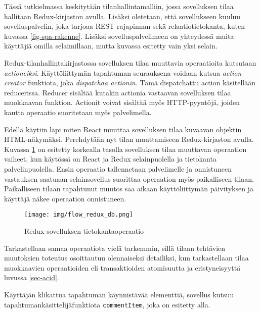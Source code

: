 \documentclass[finnish,twoside,censored,csm,sw-track-2018]{HYthesisML}
\begin{document}

Tässä tutkielmassa keskitytään tilanhallintamalliin, jossa sovelluksen tilaa hallitaan Redux-kirjaston \citep{redux} avulla. Lisäksi oletetaan, että sovellukseen kuuluu sovelluspalvelin, joka tarjoaa REST-rajapinnan sekä relaatiotietokanta, kuten kuvassa \ref{fig-spa-rakenne}. Lisäksi sovelluspalvelimeen on yhteydessä muita käyttäjiä omilla selaimillaan, mutta kuvassa esitetty vain yksi selain.

Redux-tilanhallintakirjastossa sovelluksen tilaa muuttavia operaatioita kutsutaan \textit{actioneiksi}. Käyttöliittymän tapahtuman seurauksena voidaan kutsua \textit{action creator} funktiota, joka \textit{dispatchaa actionin}. Tämä dispatchattu action käsitellään reducerissa. Reducer sisältää kutakin actionia vastaavan sovelluksen tilaa muokkaavan funktion. Actionit voivat sisältää myös HTTP-pyyntöjä, joiden kautta operaatio suoritetaan myös palvelimella.

Edellä käytiin läpi miten React muuttaa sovelluksen tilaa kuvaavan objektin HTML-näkymäksi. Perehdytään nyt tilan muuttamiseen Redux-kirjaston avulla. Kuvassa \ref{fig-redux-seq-1} on esitetty korkealla tasolla sovelluksen tilaa muuttavan operaation vaiheet, kun käytössä on React ja Redux selainpuolella ja tietokanta palvelinpuolella. Ensin operaatio tallennetaan palvelimelle ja onnistuneen vastauksen saatuaan selainsovellus suorittaa operaation myös paikalliseen tilaan. Paikalliseen tilaan tapahtunut muutos saa aikaan käyttöliittymän päivityksen ja käyttäjä näkee operaation onnistuneen.

\begin{figure}[ht]
  \centering
    \texttt{[image: img/flow\_redux\_db.png]}
  \caption{Redux-sovelluksen tietokantaoperaatio}
  \label{fig-redux-seq-1}
\end{figure}

Tarkastellaan samaa operaatiota vielä tarkemmin, sillä tilaan tehtävien muutoksien toteutus osoittautuu olennaiseksi detailiksi, kun tarkastellaan tilaa muokkaavien operaatioiden eli transaktioiden atomisuutta ja eristyneisyyttä luvussa \ref{sec-acid}.

Käyttäjän klikattua tapahtuman käynnistävää elementtiä, sovellus kutsuu tapahtumankä\-sittelijäfunktiota \verb+commentItem+, joka on esitetty alla.
\end{document}
